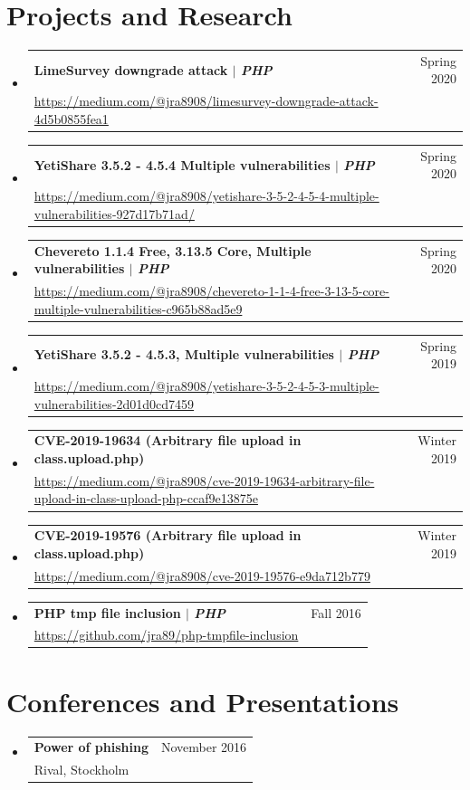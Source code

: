 \documentclass[A4,11pt]{article}
\makeatletter
\newcommand{\CVSubheading}[4]{
  \vspace{-2pt}\item
    \begin{tabular*}{0.97\textwidth}[t]{l@{\extracolsep{\fill}}r}
      \textbf{#1} & #2 \\
      \small#3 & \small #4 \\
    \end{tabular*}\vspace{-7pt}
}
\newcommand{\CVSubHeadingListStart}{\begin{itemize}[leftmargin=0.5cm, label={}]}
\newcommand{\CVSubHeadingListEnd}{\end{itemize}}
\makeatother
\begin{document}
\section{Projects and Research}
  \CVSubHeadingListStart
    \CVSubheading
      {{LimeSurvey downgrade attack} $|$ \emph{\small{PHP}}}{Spring 2020}
      {\url{https://medium.com/@jra8908/limesurvey-downgrade-attack-4d5b0855fea1}}{}
    \CVSubheading
      {{YetiShare 3.5.2 - 4.5.4 Multiple vulnerabilities} $|$ \emph{\small{PHP}}}{Spring 2020}
      {\url{https://medium.com/@jra8908/yetishare-3-5-2-4-5-4-multiple-vulnerabilities-927d17b71ad/}}{}
    \CVSubheading
      {Chevereto  1.1.4 Free,  3.13.5 Core, Multiple vulnerabilities $|$ \emph{\small{PHP}}}{Spring 2020}
      {\url{https://medium.com/@jra8908/chevereto-1-1-4-free-3-13-5-core-multiple-vulnerabilities-c965b88ad5e9}}{}
    \CVSubheading
      {{YetiShare 3.5.2 - 4.5.3, Multiple vulnerabilities} $|$ \emph{\small{PHP}}}{Spring 2019}
      {\url{https://medium.com/@jra8908/yetishare-3-5-2-4-5-3-multiple-vulnerabilities-2d01d0cd7459}}{}
    \CVSubheading
      {CVE-2019-19634 (Arbitrary file upload in class.upload.php)}{Winter 2019}
      {\url{https://medium.com/@jra8908/cve-2019-19634-arbitrary-file-upload-in-class-upload-php-ccaf9e13875e}}{}
    \CVSubheading
      {CVE-2019-19576 (Arbitrary file upload in class.upload.php)}{Winter 2019}
      {\url{https://medium.com/@jra8908/cve-2019-19576-e9da712b779}}{}
    \CVSubheading
      {{PHP tmp file inclusion} $|$ \emph{\small{PHP}}}{Fall 2016}
      {\url{https://github.com/jra89/php-tmpfile-inclusion}}{}
  \CVSubHeadingListEnd

\section{Conferences and Presentations}
  \CVSubHeadingListStart
    \CVSubheading
      {Power of phishing}{November 2016}
      {Rival, Stockholm}{}
  \CVSubHeadingListEnd

\end{document}
